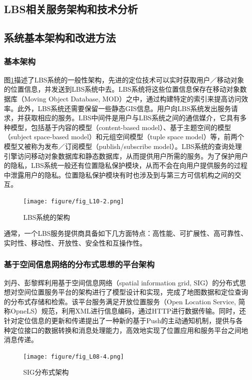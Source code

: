 \documentclass{article}
\begin{document}
\begin{CJK}{UTF8}{gbsn}
	\section{LBS相关服务架构和技术分析}
	\subsection{系统基本架构和改进方法}
	\subsubsection{基本架构}
  图\ref{fig:L10-2}描述了LBS系统的一般性架构，先进的定位技术可以实时获取用户／移动对象的位置信息，并发送到LBS系统中去\cite{L10}。LBS系统将这些位置信息保存在移动对象数据库（Moving Object Database, MOD）之中，通过构建特定的索引来提高访问效率。此外，LBS系统还需要保留一些静态GIS信息。用户向LBS系统发出服务请求，并获取相应的服务。LBS中间件是用户与LBS系统之间的通信媒介，它具有多种模型，包括基于内容的模型（content-based model）、基于主题空间的模型（subject space-based model）和元组空间模型（tuple space model）等，前两个模型又被称为发布／订阅模型（publish/subscribe model）\cite{L10}。LBS系统的查询处理引擎访问移动对象数据库和静态数据库，从而提供用户所需的服务。为了保护用户的隐私，LBS系统一般还有位置隐私保护模块，从而不会在向用户提供服务的过程中泄露用户的隐私。位置隐私保护模块有时也涉及到与第三方可信机构之间的交互。

	\begin{figure}[htbp]
		\centering
		\texttt{[image: figure/fig\_L10-2.png]}
		\caption{LBS系统的架构}
		\label{fig:L10-2}
	\end{figure}

  通常，一个LBS服务提供商具备如下几方面特点\cite{L10}：高性能、可扩展性、高可靠性、实时性、移动性、开放性、安全性和互操作性。

	\subsubsection{基于空间信息网络的分布式思想的平台架构}
   刘丹、彭黎辉利用基于空间信息网络（spatial information grid, SIG）的分布式思想对空间位置服务平台的架构进行了模型设计和实现，完成了地图数据和定位查询的分布式存储和检索\cite{L08}。该平台服务满足开放位置服务（Open Location Service, 简称OpneLS）规范，利用XML进行信息编码，通过HTTP进行数据传输。同时，还针对定位信息的更新和传递提出了一种新的基于Push的主动通知机制，提供与各种定位接口的数据转换和消息处理能力，高效地实现了位置应用和服务平台之间地消息传递。

	\begin{figure}[htbp]
		\centering
		\texttt{[image: figure/fig\_L08-4.png]}
		\caption{SIG分布式架构}
		\label{fig:L08-4}
	\end{figure}


\end{CJK}
\end{document}
